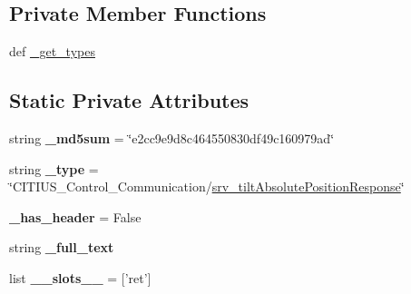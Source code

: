 \subsection*{\-Private \-Member \-Functions}
\begin{DoxyCompactItemize}
\item 
def \hyperlink{class_c_i_t_i_u_s___control___communication_1_1srv_1_1__srv__tilt_absolute_position_1_1srv__tilt_absolute_position_response_aa74bef16cf68bc824222114374e6b192}{\-\_\-get\-\_\-types}
\end{DoxyCompactItemize}
\subsection*{\-Static \-Private \-Attributes}
\begin{DoxyCompactItemize}
\item 
\hypertarget{class_c_i_t_i_u_s___control___communication_1_1srv_1_1__srv__tilt_absolute_position_1_1srv__tilt_absolute_position_response_ac8b8adcb0c572af0a218bb8d019a027a}{string {\bfseries \-\_\-md5sum} = \char`\"{}e2cc9e9d8c464550830df49c160979ad\char`\"{}}\label{class_c_i_t_i_u_s___control___communication_1_1srv_1_1__srv__tilt_absolute_position_1_1srv__tilt_absolute_position_response_ac8b8adcb0c572af0a218bb8d019a027a}

\item 
\hypertarget{class_c_i_t_i_u_s___control___communication_1_1srv_1_1__srv__tilt_absolute_position_1_1srv__tilt_absolute_position_response_a6a179d95d6090ed39642e96da36c2809}{string {\bfseries \-\_\-type} = \char`\"{}\-C\-I\-T\-I\-U\-S\-\_\-\-Control\-\_\-\-Communication/\hyperlink{class_c_i_t_i_u_s___control___communication_1_1srv_1_1__srv__tilt_absolute_position_1_1srv__tilt_absolute_position_response}{srv\-\_\-tilt\-Absolute\-Position\-Response}\char`\"{}}\label{class_c_i_t_i_u_s___control___communication_1_1srv_1_1__srv__tilt_absolute_position_1_1srv__tilt_absolute_position_response_a6a179d95d6090ed39642e96da36c2809}

\item 
\hypertarget{class_c_i_t_i_u_s___control___communication_1_1srv_1_1__srv__tilt_absolute_position_1_1srv__tilt_absolute_position_response_ac6988f7ebc0b47cd6ddc93ed77f2d515}{{\bfseries \-\_\-has\-\_\-header} = \-False}\label{class_c_i_t_i_u_s___control___communication_1_1srv_1_1__srv__tilt_absolute_position_1_1srv__tilt_absolute_position_response_ac6988f7ebc0b47cd6ddc93ed77f2d515}

\item 
string {\bfseries \-\_\-full\-\_\-text}
\item 
\hypertarget{class_c_i_t_i_u_s___control___communication_1_1srv_1_1__srv__tilt_absolute_position_1_1srv__tilt_absolute_position_response_ae756013ddcbcb77ad0127b9563c7e2d6}{list {\bfseries \-\_\-\-\_\-slots\-\_\-\-\_\-} = \mbox{[}'ret'\mbox{]}}\label{class_c_i_t_i_u_s___control___communication_1_1srv_1_1__srv__tilt_absolute_position_1_1srv__tilt_absolute_position_response_ae756013ddcbcb77ad0127b9563c7e2d6}


\end{DoxyCompactItemize}
